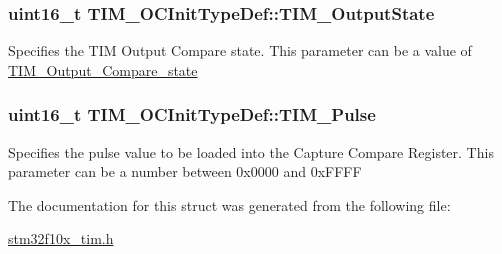 \hypertarget{structTIM__OCInitTypeDef_a2baca9c02d214d3125635a74e8d9aee4}{
\subsubsection[{TIM\_\-OutputState}]{\setlength{\rightskip}{0pt plus 5cm}uint16\_\-t {\bf TIM\_\-OCInitTypeDef::TIM\_\-OutputState}}}
\label{structTIM__OCInitTypeDef_a2baca9c02d214d3125635a74e8d9aee4}
Specifies the TIM Output Compare state. This parameter can be a value of \hyperlink{group__TIM__Output__Compare__state}{TIM\_\-Output\_\-Compare\_\-state} \hypertarget{structTIM__OCInitTypeDef_a186a3729af4e52f73f96590d805412a3}{
\subsubsection[{TIM\_\-Pulse}]{\setlength{\rightskip}{0pt plus 5cm}uint16\_\-t {\bf TIM\_\-OCInitTypeDef::TIM\_\-Pulse}}}
\label{structTIM__OCInitTypeDef_a186a3729af4e52f73f96590d805412a3}
Specifies the pulse value to be loaded into the Capture Compare Register. This parameter can be a number between 0x0000 and 0xFFFF 

The documentation for this struct was generated from the following file:\begin{DoxyCompactItemize}
\item 
\hyperlink{stm32f10x__tim_8h}{stm32f10x\_\-tim.h}\end{DoxyCompactItemize}

